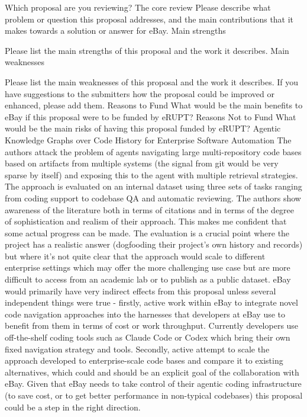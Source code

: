

Which proposal are you reviewing?
The core review
Please describe what problem or question this proposal addresses, and the main contributions that it makes towards a solution or answer for eBay. 
Main strengths

Please list the main strengths of this proposal and the work it describes. 
Main weaknesses

Please list the main weaknesses of this proposal and the work it describes. 
If you have suggestions to the submitters how the proposal could be improved or enhanced, please add them.
Reasons to Fund
What would be the main benefits to eBay if this proposal were to be funded by eRUPT? 
Reasons Not to Fund
What would be the main risks of having this proposal funded by eRUPT? 
Agentic Knowledge Graphs over Code History for Enterprise Software Automation
The authors attack the problem of agents navigating large multi-repository code bases based on artifacts from multiple systems (the signal from git would be very sparse by itself) and exposing this to the agent with multiple retrieval strategies. The approach is evaluated on an internal dataset using three sets of tasks ranging from coding support to codebase QA and automatic reviewing.
The authors show awareness of the literature both in terms of citations and in terms of the degree of sophistication and realism of their approach. This makes me confident that some actual progress can be made.
The evaluation is a crucial point where the project has a realistic answer (dogfooding their project's own history and records) but where it's not quite clear that the approach would scale to different enterprise settings which may offer the more challenging use case but are more difficult to access from an academic lab or to publish as a public dataset.
eBay would primarily have very indirect effects from this proposal unless several independent things were true - firstly, active work within eBay to integrate novel code navigation approaches into the harnesses that developers at eBay use to benefit from them in terms of cost or work throughput. Currently developers use off-the-shelf coding tools such as Claude Code or Codex which bring their own fixed navigation strategy and tools. Secondly, active attempt to scale the approach developed to enterprise-scale code bases and compare it to existing alternatives, which could and should be an explicit goal of the collaboration with eBay. Given that eBay needs to take control of their agentic coding infrastructure (to save cost, or to get better performance in non-typical codebases) this proposal could be a step in the right direction.
